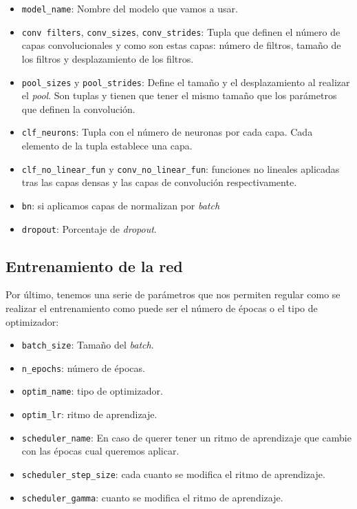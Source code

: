 \documentclass[a4paper,12pt,oneside,titlepage]{book}
\newcommand{\inline}[1]{\texttt{#1}}
\begin{document}
\begin{itemize}
  \item \inline{model_name}: Nombre del modelo que vamos a usar.
  \item \inline{conv filters}, \inline{conv_sizes}, \inline{conv_strides}: Tupla que definen el número de capas convolucionales y como son estas capas: número de filtros, tamaño de los filtros y desplazamiento de los filtros.
  \item \inline{pool_sizes} y \inline{pool_strides}: Define el tamaño y el desplazamiento al realizar el \textit{pool}. Son tuplas y tienen que tener el mismo tamaño que los parámetros que definen la convolución.
  \item \inline{clf_neurons}: Tupla con el número de neuronas por cada capa. Cada elemento de la tupla establece una capa.
  \item \inline{clf_no_linear_fun} y \inline{conv_no_linear_fun}: funciones no lineales aplicadas tras las capas densas y las capas de convolución respectivamente.
  \item \inline{bn}: si aplicamos capas de normalizan por \textit{batch}
  \item \inline{dropout}: Porcentaje de \textit{dropout}. 
\end{itemize}

\subsection*{Entrenamiento de la red}

Por último, tenemos una serie de parámetros que nos permiten regular como se realizar el entrenamiento como puede ser el número de épocas o el tipo de optimizador:

\begin{itemize}
  \item \inline{batch_size}: Tamaño del \textit{batch}.
  \item \inline{n_epochs}: número de épocas.
  \item \inline{optim_name}: tipo de optimizador.
  \item \inline{optim_lr}: ritmo de aprendizaje.
  \item \inline{scheduler_name}: En caso de querer tener un ritmo de aprendizaje que cambie con las épocas cual queremos aplicar.
  \item \inline{scheduler_step_size}: cada cuanto se modifica el ritmo de aprendizaje.
  \item \inline{scheduler_gamma}: cuanto se modifica el ritmo de aprendizaje.
\end{itemize}
\end{document}
